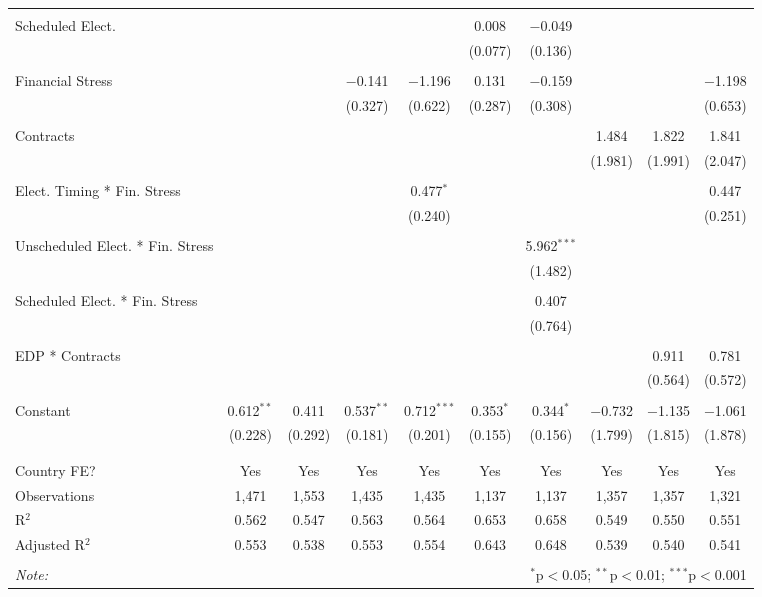 \begin{table}[!htbp]
\begin{tabular}{@{\extracolsep{5pt}}lccccccccc}
  & & & & & & & & & \\ 
 Scheduled Elect. &  &  &  &  & 0.008 & $-$0.049 &  &  &  \\ 
  &  &  &  &  & (0.077) & (0.136) &  &  &  \\ 
  & & & & & & & & & \\ 
 Financial Stress &  &  & $-$0.141 & $-$1.196 & 0.131 & $-$0.159 &  &  & $-$1.198 \\ 
  &  &  & (0.327) & (0.622) & (0.287) & (0.308) &  &  & (0.653) \\ 
  & & & & & & & & & \\ 
 Contracts &  &  &  &  &  &  & 1.484 & 1.822 & 1.841 \\ 
  &  &  &  &  &  &  & (1.981) & (1.991) & (2.047) \\ 
  & & & & & & & & & \\ 
 Elect. Timing * Fin. Stress &  &  &  & 0.477$^{*}$ &  &  &  &  & 0.447 \\ 
  &  &  &  & (0.240) &  &  &  &  & (0.251) \\ 
  & & & & & & & & & \\ 
 Unscheduled Elect. * Fin. Stress &  &  &  &  &  & 5.962$^{***}$ &  &  &  \\ 
  &  &  &  &  &  & (1.482) &  &  &  \\ 
  & & & & & & & & & \\ 
 Scheduled Elect. * Fin. Stress &  &  &  &  &  & 0.407 &  &  &  \\ 
  &  &  &  &  &  & (0.764) &  &  &  \\ 
  & & & & & & & & & \\ 
 EDP * Contracts &  &  &  &  &  &  &  & 0.911 & 0.781 \\ 
  &  &  &  &  &  &  &  & (0.564) & (0.572) \\ 
  & & & & & & & & & \\ 
 Constant & 0.612$^{**}$ & 0.411 & 0.537$^{**}$ & 0.712$^{***}$ & 0.353$^{*}$ & 0.344$^{*}$ & $-$0.732 & $-$1.135 & $-$1.061 \\ 
  & (0.228) & (0.292) & (0.181) & (0.201) & (0.155) & (0.156) & (1.799) & (1.815) & (1.878) \\ 
  & & & & & & & & & \\ 
\hline \\[-1.8ex] 
Country FE? & Yes & Yes & Yes & Yes & Yes & Yes & Yes & Yes & Yes \\ 
Observations & 1,471 & 1,553 & 1,435 & 1,435 & 1,137 & 1,137 & 1,357 & 1,357 & 1,321 \\ 
R$^{2}$ & 0.562 & 0.547 & 0.563 & 0.564 & 0.653 & 0.658 & 0.549 & 0.550 & 0.551 \\ 
Adjusted R$^{2}$ & 0.553 & 0.538 & 0.553 & 0.554 & 0.643 & 0.648 & 0.539 & 0.540 & 0.541 \\ 
\hline 
\hline \\[-1.8ex] 
\textit{Note:}  & \multicolumn{9}{r}{$^{*}$p$<$0.05; $^{**}$p$<$0.01; $^{***}$p$<$0.001} \\ 
\end{tabular} 
\end{table} 
